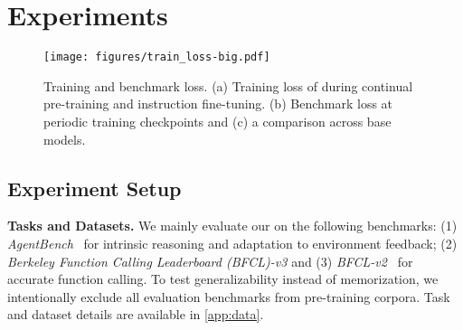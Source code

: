 \section{Experiments}
\label{sec:exp}

\begin{figure*}[t]
  \centering
  \vspace{-2ex}
  \texttt{[image: figures/train\_loss-big.pdf]}
  \caption{Training and benchmark loss. (a) Training loss of \method during continual pre-training and instruction fine-tuning. (b) Benchmark loss at periodic training checkpoints and (c) a comparison across base models.
  }
  \vspace{-1ex}
  \label{fig:val_loss}
\end{figure*}



\subsection{Experiment Setup}
\noindent \textbf{Tasks and Datasets.} 
We mainly evaluate our \method on the following benchmarks:
(1) \emph{AgentBench}~\cite{liu2024agentbench} for intrinsic reasoning and adaptation to environment feedback;
(2) \emph{Berkeley Function Calling Leaderboard (BFCL)-v3} and (3) \emph{BFCL-v2}~\cite{patil2023gorilla} for accurate function calling.
To test generalizability instead of memorization, we intentionally exclude all evaluation benchmarks from pre-training corpora.
Task and dataset details are available in \cref{app:data}.

